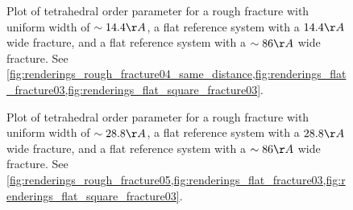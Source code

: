 \begin{figure}[!p]%
    \centering%
    {
        \captionsetup{width=\textwidth} 
        \caption{%
            Plot of tetrahedral order parameter for a rough fracture with uniform width of $\sim 14.4\AA$, a flat reference system with a $14.4\AA$ wide fracture, and a flat reference system with a $\sim 86 \AA$ wide fracture. See \cref{fig:renderings_rough_fracture04_same_distance,fig:renderings_flat_fracture03,fig:renderings_flat_square_fracture03}.%
        }%
    }
\end{figure}%
%
\begin{figure}[!p]%
    \centering%
    {
        \captionsetup{width=\textwidth} 
        \caption{%
            Plot of tetrahedral order parameter for a rough fracture with uniform width of $\sim 28.8\AA$, a flat reference system with a $28.8\AA$ wide fracture, and a flat reference system with a $\sim 86 \AA$ wide fracture. See \cref{fig:renderings_rough_fracture05,fig:renderings_flat_fracture03,fig:renderings_flat_square_fracture03}.%
        }%
    }
\end{figure}%
